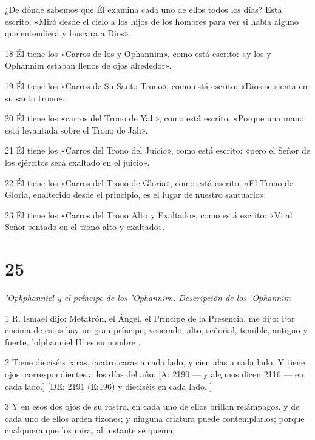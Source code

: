 ¿De dónde sabemos que Él examina cada uno de ellos todos los días? Está escrito: «Miró desde el cielo a los hijos de los hombres para ver si había alguno que entendiera y buscara a Dios».

\par 18 Él tiene los «Carros de los y Ophannim», como está escrito: «y los y Ophannim estaban llenos de ojos alrededor».

\par 19 Él tiene los «Carros de Su Santo Trono», como está escrito: «Dios se sienta en su santo trono».

\par 20 Él tiene los «carros del Trono de Yah», como está escrito: «Porque una mano está levantada sobre el Trono de Jah».

\par 21 Él tiene los «Carros del Trono del Juicio», como está escrito: «pero el Señor de los ejércitos será exaltado en el juicio».

\par 22 Él tiene los «Carros del Trono de Gloria», como está escrito: «El Trono de Gloria, enaltecido desde el principio, es el lugar de nuestro santuario».

\par 23 Él tiene los «Carros del Trono Alto y Exaltado», como está escrito: «Vi al Señor sentado en el trono alto y exaltado».

\chapter{25}

\par \textit{'Ophphanniel y el príncipe de los 'Ophannirn. Descripción de los 'Ophannim}

\par 1 R. Ismael dijo: Metatrón, el Ángel, el Príncipe de la Presencia, me dijo: Por encima de estos hay un gran príncipe, venerado, alto, señorial, temible, antiguo y fuerte, 'ofphanniel H' es su nombre .

\par 2 Tiene dieciséis caras, cuatro caras a cada lado, y cien alas a cada lado. Y tiene ojos, correspondientes a los días del año. [A: 2190 — y algunos dicen 2116 — en cada lado.] [DE: 2191 (E:196) y dieciséis en cada lado. ]

\par 3 Y en esos dos ojos de su rostro, en cada uno de ellos brillan relámpagos, y de cada uno de ellos arden tizones; y ninguna criatura puede contemplarlos; porque cualquiera que los mira, al instante se quema.

